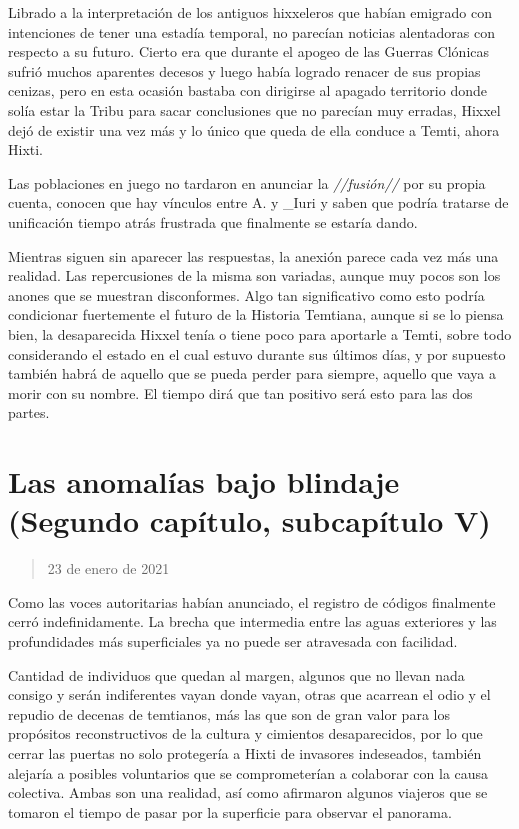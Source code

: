 \documentclass[
  spanish,
]{book}
\begin{document}
Librado a la interpretación de los antiguos hixxeleros que habían emigrado con intenciones de tener una estadía temporal, no parecían noticias alentadoras con respecto a su futuro. Cierto era que durante el apogeo de las Guerras Clónicas sufrió muchos aparentes decesos y luego había logrado renacer de sus propias cenizas, pero en esta ocasión bastaba con dirigirse al apagado territorio donde solía estar la Tribu para sacar conclusiones que no parecían muy erradas, Hixxel dejó de existir una vez más y lo único que queda de ella conduce a Temti, ahora Hixti.

Las poblaciones en juego no tardaron en anunciar la \emph{//fusión//} por su propia cuenta, conocen que hay vínculos entre A. y \_Iuri y saben que podría tratarse de unificación tiempo atrás frustrada que finalmente se estaría dando.

Mientras siguen sin aparecer las respuestas, la anexión parece cada vez más una realidad. Las repercusiones de la misma son variadas, aunque muy pocos son los anones que se muestran disconformes. Algo tan significativo como esto podría condicionar fuertemente el futuro de la Historia Temtiana, aunque si se lo piensa bien, la desaparecida Hixxel tenía o tiene poco para aportarle a Temti, sobre todo considerando el estado en el cual estuvo durante sus últimos días, y por supuesto también habrá de aquello que se pueda perder para siempre, aquello que vaya a morir con su nombre. El tiempo dirá que tan positivo será esto para las dos partes.

\hypertarget{las-anomaluxedas-bajo-blindaje-segundo-capuxedtulo-subcapuxedtulo-v}{%
\section{Las anomalías bajo blindaje (Segundo capítulo, subcapítulo V)}\label{las-anomaluxedas-bajo-blindaje-segundo-capuxedtulo-subcapuxedtulo-v}}

\begin{quote}
23 de enero de 2021
\end{quote}

Como las voces autoritarias habían anunciado, el registro de códigos finalmente cerró indefinidamente. La brecha que intermedia entre las aguas exteriores y las profundidades más superficiales ya no puede ser atravesada con facilidad.

Cantidad de individuos que quedan al margen, algunos que no llevan nada consigo y serán indiferentes vayan donde vayan, otras que acarrean el odio y el repudio de decenas de temtianos, más las que son de gran valor para los propósitos reconstructivos de la cultura y cimientos desaparecidos, por lo que cerrar las puertas no solo protegería a Hixti de invasores indeseados, también alejaría a posibles voluntarios que se comprometerían a colaborar con la causa colectiva. Ambas son una realidad, así como afirmaron algunos viajeros que se tomaron el tiempo de pasar por la superficie para observar el panorama.
\end{document}

